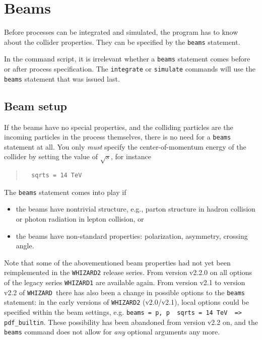 \documentclass[12pt]{book}
\newcommand{\ttt}[1]{\texttt{#1}}
\newcommand{\whizard}{\ttt{WHIZARD}}
\begin{document}
\section{Beams}
\label{sec:beams}

Before processes can be integrated and simulated, the program has to know
about the collider properties.  They can be specified by the \ttt{beams}
statement.

In the command script, it is irrelevant whether a \ttt{beams} statement comes
before or after process specification.  The \ttt{integrate} or \ttt{simulate}
commands will use the \ttt{beams} statement that was issued last.


\subsection{Beam setup}
\label{sec:beam-setup}

If the beams have no special properties, and the colliding particles are the
incoming particles in the process themselves, there is no need for a
\ttt{beams} statement at all.  You only \emph{must} specify the
center-of-momentum energy of the collider by setting the value of $\sqrt{s}$,
for instance
\begin{quote}
\begin{footnotesize}
\begin{verbatim}
  sqrts = 14 TeV
\end{verbatim}
\end{footnotesize}
\end{quote}
The \ttt{beams} statement comes into play if
\begin{itemize}
\item
  the beams have nontrivial structure, e.g., parton structure in hadron
  collision or photon radiation in lepton collision, or
\item
  the beams have non-standard properties: polarization, asymmetry, crossing
  angle.
\end{itemize}
Note that some of the abovementioned beam properties had not yet been
reimplemented in the \whizard\ttt{2} release series. From version
v2.2.0 on all options of the legacy series \whizard\ttt{1} are
available again. From version v2.1 to version v2.2 of \whizard\ there
has also been a change in possible options to the \ttt{beams}
statement: in the early versions of \whizard\ttt{2} (v2.0/v2.1), local
options could be specified within the beam settings, e.g. \ttt{beams =
p, p { sqrts = 14 TeV } => pdf\_builtin}. These possibility has been
abandoned from version v2.2 on, and the \ttt{beams} command does not
allow for {\em any} optional arguments any more.
\end{document}
